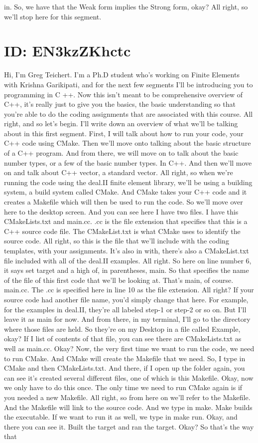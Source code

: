 \documentclass[10pt]{article}
\begin{document}
in. So, we have that the Weak form implies the Strong form, okay? All right, so we'll stop here for this segment.

\section*{ID: EN3kzZKhctc}
Hi, I'm Greg Teichert. I'm a Ph.D student who's working on Finite Elements with Krishna Garikipati, and for the next few segments I'll be introducing you to programming in C ++. Now this isn't meant to be comprehensive overview of C++, it's really just to give you the basics, the basic understanding so that you're able to do the coding assignments that are associated with this course. All right, and so let's begin. I'll write down an overview of what we'll be talking about in this first segment. First, I will talk about how to run your code, your C++ code using CMake. Then we'll move onto talking about the basic structure of a C++ program. And from there, we will move on to talk about the basic number types, or a few of the basic number types. In C++. And then we'll move on and talk about C++ vector, a standard vector. All right, so when we're running the code using the deal.II finite element library, we'll be using a building system, a build system called CMake. And CMake takes your C++ code and it creates a Makefile which will then be used to run the code. So we'll move over here to the desktop screen. And you can see here I have two files. I have this CMakeLists.txt and main.cc. .cc is the file extension that specifies that this is a C++ source code file. The CMakeList.txt is what CMake uses to identify the source code. All right, so this is the file that we'll include with the coding templates, with your assignments. It's also in with, there's also a CMakeList.txt file included with all of the deal.II examples. All right. So here on line number 6, it says set target and a high of, in parentheses, main. So that specifies the name of the file of this first code that we'll be looking at. That's main, of course. main.cc. The .cc is specified here in line 10 as the file extension. All right? If your source code had another file name, you'd simply change that here. For example, for the examples in deal.II, they're all labeled step-1 or step-2 or so on. But I'll leave it as main for now. And from there, in my terminal, I'll go to the directory where those files are held. So they're on my Desktop in a file called Example, okay? If I list of contents of that file, you can see there are CMakeLists.txt as well as main.cc. Okay? Now, the very first time we want to run the code, we need to run CMake. And CMake will create the Makefile that we need. So, I type in CMake and then CMakeLists.txt. And there, if I open up the folder again, you can see it's created several different files, one of which is this Makefile. Okay, now we only have to do this once. The only time we need to run CMake again is if you needed a new Makefile. All right, so from here on we'll refer to the Makefile. And the Makefile will link to the source code. And we type in make. Make builds the executable. If we want to run it as well, we type in make run. Okay, and there you can see it. Built the target and ran the target. Okay? So that's the way that 
\end{document}
